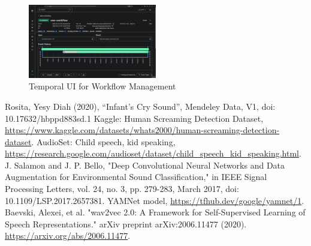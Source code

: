 \documentclass[conference]{IEEEtran}
\begin{document}
\begin{figure}[htbp]
\centerline{\includegraphics[width=0.5\textwidth]{temporal.png}}
\caption{Temporal UI for Workflow Management}
\label{fig:temporal_ui}
\end{figure}



\begin{thebibliography}{00}
     Rosita, Yesy Diah (2020), “Infant's Cry Sound”, Mendeley Data, V1, doi: 10.17632/hbppd883sd.1
     Kaggle: Human Screaming Detection Dataset, \url{https://www.kaggle.com/datasets/whats2000/human-screaming-detection-dataset}.
     AudioSet: Child speech, kid speaking, \url{https://research.google.com/audioset/dataset/child_speech_kid_speaking.html}.
     J. Salamon and J. P. Bello, "Deep Convolutional Neural Networks and Data Augmentation for Environmental Sound Classification," in IEEE Signal Processing Letters, vol. 24, no. 3, pp. 279-283, March 2017, doi: 10.1109/LSP.2017.2657381. 
     YAMNet model, \url{https://tfhub.dev/google/yamnet/1}. 
     Baevski, Alexei, et al. "wav2vec 2.0: A Framework for Self-Supervised Learning of Speech Representations." arXiv preprint arXiv:2006.11477 (2020). \url{https://arxiv.org/abs/2006.11477}.
\end{thebibliography}
\vspace{12pt}
\end{document}
